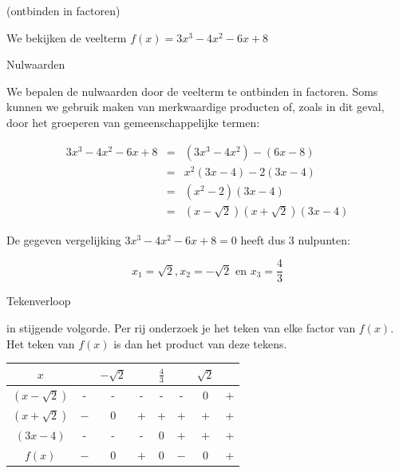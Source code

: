 \begin{voorbeeld}
\end{voorbeeld}

\begin{voorbeeld}
	(ontbinden in factoren)

We bekijken de veelterm $f(x)=3x^{3}-4x^{2}-6x+8$

Nulwaarden

We bepalen de nulwaarden door de veelterm te ontbinden in
factoren. Soms kunnen we gebruik maken van merkwaardige producten
of, zoals in dit geval, door het groeperen van gemeenschappelijke
termen:

\begin{eqnarray*}
3x^{3}-4x^{2}-6x+8 & = & (3x^{3}-4x^{2})-(6x-8)\\
 & = & x^{2}(3x-4)-2(3x-4)\\
 & = & (x^{2}-2)(3x-4)\\
 & = & (x-\sqrt{2})(x+\sqrt{2})(3x-4)
\end{eqnarray*}

 De gegeven vergelijking $3x^{3}-4x^{2}-6x+8=0$ heeft dus
3 nulpunten:

\begin{equation*}
x_{1}=\sqrt{2}, x_{2}=-\sqrt{2} \text{ en } x_{3}=\frac{4}{3}
\end{equation*}

Tekenverloop

in stijgende volgorde. Per rij onderzoek je het teken van elke factor
van $f(x)$. Het teken van $f(x)$ is dan het product van deze tekens.

\begin{center}
\begin{tabular}{c||ccccccc}
$x$ &  & $-\sqrt{2}$ &  & $\frac{4}{3}$ &  & $\sqrt{2}$ & \\
\hline 
$(x-\sqrt{2})$ & - & - & -& -& - & $0$ & $+$ \\
$(x+\sqrt{2})$ & $-$ & $0$ & + & + & +&+&+ \\
$(3x-4)$ & - & - & - & $0$ & +&+&+ \\
\hline 
$f(x)$ & $-$ & $0$ & $+$ & $0$ & $-$ & $0$ & + \\
\end{tabular}
\end{center}


\end{voorbeeld}

